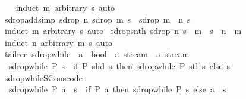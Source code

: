 \begin{isabellebody}
%
\isadelimproof
\ \ %
\endisadelimproof
%
\isatagproof
{}\isamarkupfalse%
\ {\isacharparenleft}induct\ m\ arbitrary{\isacharcolon}\ s{\isacharparenright}\ auto%
\endisatagproof
{\isafoldproof}%
%
\isadelimproof
\isanewline
%
\endisadelimproof
\isanewline
{}\isamarkupfalse%
\ sdrop{\isacharunderscore}add{\isacharbrackleft}simp{\isacharbrackright}{\isacharcolon}\ {\isachardoublequoteopen}sdrop\ n\ {\isacharparenleft}sdrop\ m\ s{\isacharparenright}\ {\isacharequal}\ sdrop\ {\isacharparenleft}m\ {\isacharplus}\ n{\isacharparenright}\ s{\isachardoublequoteclose}\isanewline
%
\isadelimproof
\ \ %
\endisadelimproof
%
\isatagproof
{}\isamarkupfalse%
\ {\isacharparenleft}induct\ m\ arbitrary{\isacharcolon}\ s{\isacharparenright}\ auto%
\endisatagproof
{\isafoldproof}%
%
\isadelimproof
\isanewline
%
\endisadelimproof
\isanewline
{}\isamarkupfalse%
\ sdrop{\isacharunderscore}snth{\isacharcolon}\ {\isachardoublequoteopen}sdrop\ n\ s\ {\isacharbang}{\isacharbang}\ m\ {\isacharequal}\ s\ {\isacharbang}{\isacharbang}\ {\isacharparenleft}n\ {\isacharplus}\ m{\isacharparenright}{\isachardoublequoteclose}\isanewline
%
\isadelimproof
\ \ %
\endisadelimproof
%
\isatagproof
{}\isamarkupfalse%
\ {\isacharparenleft}induct\ n\ arbitrary{\isacharcolon}\ m\ s{\isacharparenright}\ auto%
\endisatagproof
{\isafoldproof}%
%
\isadelimproof
\isanewline
%
\endisadelimproof
\isanewline
{}\isamarkupfalse%
\ {\isacharparenleft}tailrec{\isacharparenright}\ sdrop{\isacharunderscore}while\ {\isacharcolon}{\isacharcolon}\ {\isachardoublequoteopen}{\isacharparenleft}{\isacharprime}a\ {\isasymRightarrow}\ bool{\isacharparenright}\ {\isasymRightarrow}\ {\isacharprime}a\ stream\ {\isasymRightarrow}\ {\isacharprime}a\ stream{\isachardoublequoteclose}\ \isanewline
\ \ {\isachardoublequoteopen}sdrop{\isacharunderscore}while\ P\ s\ {\isacharequal}\ {\isacharparenleft}if\ P\ {\isacharparenleft}shd\ s{\isacharparenright}\ then\ sdrop{\isacharunderscore}while\ P\ {\isacharparenleft}stl\ s{\isacharparenright}\ else\ s{\isacharparenright}{\isachardoublequoteclose}\isanewline
\isanewline
{}\isamarkupfalse%
\ sdrop{\isacharunderscore}while{\isacharunderscore}SCons{\isacharbrackleft}code{\isacharbrackright}{\isacharcolon}\isanewline
\ \ {\isachardoublequoteopen}sdrop{\isacharunderscore}while\ P\ {\isacharparenleft}a\ {\isacharhash}{\isacharhash}\ s{\isacharparenright}\ {\isacharequal}\ {\isacharparenleft}if\ P\ a\ then\ sdrop{\isacharunderscore}while\ P\ s\ else\ a\ {\isacharhash}{\isacharhash}\ s{\isacharparenright}{\isachardoublequoteclose}\isanewline

\end{isabellebody}
